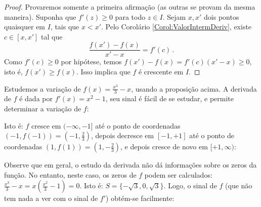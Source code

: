 \begin{proof}
Provaremos somente a primeira afirmação (as outras se provam da mesma maneira).
Suponha que $f'(z)\geq 0$ para todo $z\in I$. Sejam $x,x'$ dois pontos
quaisquer em $I$, tais que
$x<x'$. Pelo Corolário \ref{Corol:ValorIntermDeriv}, existe $c\in [x,x']$ tal
que
$$\frac{f(x')-f(x)}{x'-x}=f'(c)\,.$$
Como $f'(c)\geq 0$ por hipótese, temos $f(x')-f(x)=f'(c)(x'-x)\geq 0$, isto é,
$f(x')\geq f(x)$. Isso implica que $f$ é crescente em $I$.
\end{proof}

\begin{ex}
Estudemos a variação de $f(x)=\frac{x^3}{3}-x$, usando a proposição acima.
A derivada de $f$ é dada por $f'(x)=x^2-1$, seu sinal é fácil de se estudar, e 
permite determinar a variação de $f$:
\begin{center}
\begin{bmlimage}\end{bmlimage}
\end{center}
Isto é: $f$
cresce em $(-\infty,-1]$ até o ponto de coordenadas $(-1,f(-1))=(-1,\tfrac23)$,
depois decresce em $[-1,+1]$ até o ponto de coordenadas
$(1,f(1))=(1,-\tfrac23)$, e depois cresce de novo em $[+1,\infty)$:
\begin{center}
\begin{bmlimage}\end{bmlimage}
\end{center}
Observe que em geral, o estudo da derivada não dá informações sobre os zeros da função. 
No entanto, neste caso,
os zeros de $f$ podem ser calculados:
$\frac{x^3}{3}-x=x(\frac{x^2}{3}-1)=0$. Isto é: $S=\{-\sqrt{3},0,\sqrt{3}\}$.
Logo, o sinal de $f$ (que não tem nada a ver com o sinal de $f'$) obtém-se facilmente:
\begin{center}
\begin{bmlimage}\end{bmlimage}
\end{center}

\end{ex}

